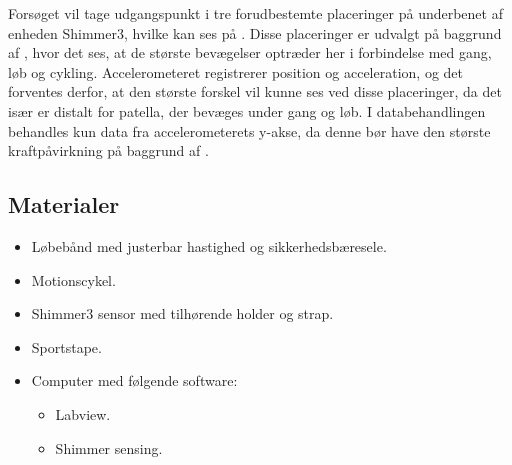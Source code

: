 Forsøget vil tage udgangspunkt i tre forudbestemte placeringer på underbenet af enheden Shimmer3, hvilke kan ses på . Disse placeringer er udvalgt på baggrund af , hvor det ses, at de største bevægelser optræder her i forbindelse med gang, løb og cykling. Accelerometeret registrerer position og acceleration, og det forventes derfor, at den største forskel vil kunne ses ved disse placeringer, da det især er distalt for patella, der bevæges under gang og løb. I databehandlingen behandles kun data fra accelerometerets y-akse, da denne bør have den største kraftpåvirkning på baggrund af .

\subsection{Materialer}
\begin{itemize}
	\item Løbebånd med justerbar hastighed og sikkerhedsbæresele.
	\item Motionscykel.
	\item Shimmer3 sensor med tilhørende holder og strap.
	\item Sportstape.
	\item Computer med følgende software:
	\begin{itemize}
		\item Labview.
		\item Shimmer sensing.
	\end{itemize}
\end{itemize}

